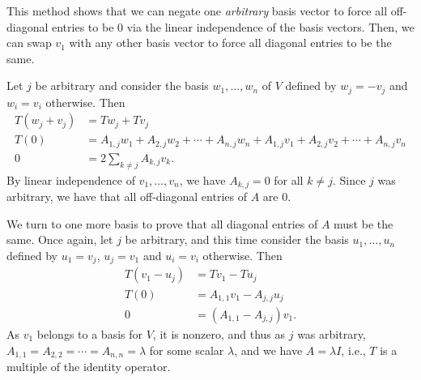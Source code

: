 This method shows that we can negate one \emph{arbitrary} basis vector to force all off-diagonal entries to be 0 via the linear independence of the basis vectors.
Then, we can swap $v_1$ with any other basis vector to force all diagonal entries to be the same.

\begin{coole}
    Let $j$ be arbitrary and consider the basis $w_1, \dots, w_n$ of $V$ defined by $w_j = -v_j$ and $w_i = v_i$ otherwise.
	Then
    \begin{align*}
        T(w_j + v_j) &= Tw_j + Tv_j \\
        T(0) &= A_{1,j}w_1 + A_{2,j}w_2 + \cdots + A_{n,j}w_n + A_{1,j}v_1 + A_{2,j}v_2 + \cdots + A_{n,j}v_n \\
        0 &= 2\sum_{k \neq j}A_{k,j}v_k.
    \end{align*}
    By linear independence of $v_1, \dots, v_n$, we have $A_{k,j} = 0$ for all $k \neq j$.
	Since $j$ was arbitrary, we have that all off-diagonal entries of $A$ are 0.

    We turn to one more basis to prove that all diagonal entries of $A$ must be the same.
	Once again, let $j$ be arbitrary, and this time consider the basis $u_1, \dots, u_n$ defined by $u_1 = v_j$, $u_j = v_1$ and $u_i = v_i$ otherwise.
	Then
    \begin{align*}
        T(v_1 - u_j) &= Tv_1 - Tu_j \\
        T(0) &= A_{1,1}v_1 - A_{j,j}u_j \\
        0 &= (A_{1,1} - A_{j,j})v_1.
    \end{align*}
    As $v_1$ belongs to a basis for $V$, it is nonzero, and thus as $j$ was arbitrary, $A_{1,1} = A_{2,2} = \cdots = A_{n,n} = \lambda$ for some scalar $\lambda$, and we have $A = \lambda I$, i.e., $T$ is a multiple of the identity operator.
\end{coole}


